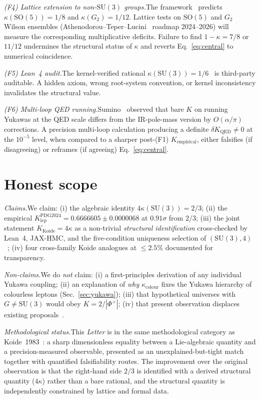\documentclass[aps,prl,reprint,amsmath,amssymb,nofootinbib,floatfix,superscriptaddress]{revtex4-2}
\newcommand{\SU}{\mathrm{SU}}
\newcommand{\SO}{\mathrm{SO}}
\newcommand{\Phiroots}{\Phi^{+}}
\begin{document}
\textit{(F4) Lattice extension to non-$\SU(3)$ groups.}\quad The framework~\cite{Remondiere2026b} predicts $\kappa(\SO(5)) = 1/8$ and $\kappa(G_2) = 1/12$. Lattice tests on $\SO(5)$ and $G_2$ Wilson ensembles (Athenodorou--Teper--Lucini~\cite{AthenodorouTeper2021} roadmap 2024--2026) will measure the corresponding multiplicative deficits. Failure to find $1 - \kappa = 7/8$ or $11/12$ undermines the structural status of $\kappa$ and reverts Eq.~\eqref{eq:central} to numerical coincidence.

\textit{(F5) Lean~4 audit.}\quad The kernel-verified rational $\kappa(\SU(3)) = 1/6$~\cite{Remondiere2026b} is third-party auditable. A hidden axiom, wrong root-system convention, or kernel inconsistency invalidates the structural value.

\textit{(F6) Multi-loop QED running.}\quad Sumino~\cite{Sumino2009a} observed that bare $K$ on running Yukawas at the QED scale differs from the IR-pole-mass version by $O(\alpha/\pi)$ corrections. A precision multi-loop calculation producing a definite $\delta K_{\mathrm{QED}} \neq 0$ at the $10^{-5}$ level, when compared to a sharper post-(F1) $K_{\mathrm{empirical}}$, either falsifies (if disagreeing) or reframes (if agreeing) Eq.~\eqref{eq:central}.

\section{Honest scope}
\label{sec:scope}

\textit{Claims.}\quad We claim: (i) the algebraic identity $4\kappa(\SU(3)) = 2/3$; (ii) the empirical $K_{\mathrm{lep}}^{\mathrm{PDG 2024}} = 0.6666605 \pm 0.0000068$ at $0.91\sigma$ from $2/3$; (iii) the joint statement $K_{\mathrm{Koide}} = 4\kappa$ as a non-trivial \emph{structural identification} cross-checked by Lean~4, JAX-HMC, and the five-condition uniqueness selection of $(\SU(3), 4)$~\cite{Remondiere2026a}; (iv) four cross-family Koide analogues at $\le 2.5\%$ documented for transparency.

\textit{Non-claims.}\quad We do \emph{not} claim: (i) a first-principles derivation of any individual Yukawa coupling; (ii) an explanation of \emph{why} $\kappa_{\mathrm{colour}}$ fixes the Yukawa hierarchy of colourless leptons (Sec.~\ref{sec:yukawa}); (iii) that hypothetical universes with $G \neq \SU(3)$ would obey $K = 2/|\Phiroots|$; (iv) that present observation displaces existing proposals~\cite{Foot1994,Sumino2009a,Sumino2009b,Brannen2006}.

\textit{Methodological status.}\quad This \textit{Letter} is in the same methodological category as Koide~1983~\cite{Koide1983}: a sharp dimensionless equality between a Lie-algebraic quantity and a precision-measured observable, presented as an unexplained-but-tight match together with quantified falsifiability routes. The improvement over the original observation is that the right-hand side $2/3$ is identified with a derived structural quantity ($4\kappa$) rather than a bare rational, and the structural quantity is independently constrained by lattice and formal data.
\end{document}
